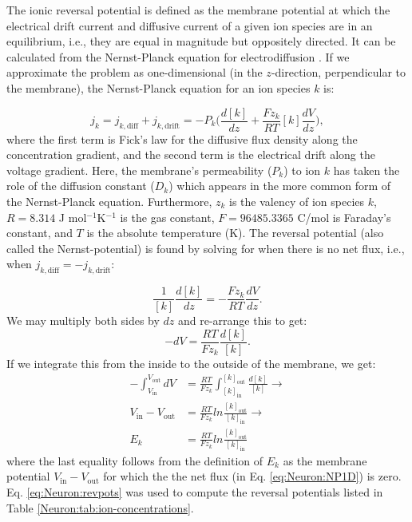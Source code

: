 The ionic reversal potential is defined as the membrane potential at which the electrical drift current and diffusive current of a given ion species are in an equilibrium, i.e., they are equal in magnitude but oppositely directed. It can be calculated from the Nernst-Planck equation for electrodiffusion . If we approximate the problem as one-dimensional (in the $z$-direction, perpendicular to the membrane), the Nernst-Planck equation for an ion species $k$ is:

\begin{equation}
j_k = j_{k,\text{diff}} + j_{k,\text{drift}} 
=  - P_k \Big(\frac{d[k]}{dz} +  \frac{Fz_k}{RT}  [k] \frac{dV}{dz} \Big), 
\label{eq:Neuron:NP1D}
\end{equation}
where the first term is Fick's law for the diffusive flux density along the concentration gradient, and the second term is the electrical drift along the voltage gradient. Here, the membrane's permeability ($P_k$) to ion $k$ has taken the role of the diffusion constant ($D_k$) which appears in the more common form of the Nernst-Planck equation. Furthermore, $z_{k}$ is the valency of ion species $k$, $R = 8.314$ J mol$^{-1}$K$^{-1}$ is the gas constant, $F = 96485.3365$ C/mol is Faraday's constant, and $T$ is the absolute temperature (K). The reversal potential (also called the Nernst-potential) is found by solving for when there is no net flux, i.e., when  $j_{k,\text{diff}} = - j_{k,\text{drift}}$:

\begin{equation}
\frac{1}{[k]} \frac{d[k]}{dz} = - \frac{Fz_k}{RT}  \frac{dV}{dz}.
\end{equation}
We may multiply both sides by $dz$ and re-arrange this to get:
\begin{equation}
-dV = \frac{RT}{Fz_k}  \frac{d[k]}{[k]}.
\end{equation}
If we integrate this from the inside to the outside of the membrane, we get:
\begin{align}
-\int_{V_{\text{in}}}^{V_{\text{out}}}  dV &= \frac{RT}{Fz_k}  \int_{[k]_{\text{in}}}^{[k]_{\text{out}}} \frac{d[k]}{[k]} \rightarrow \\
V_{\text{in}}-V_{\text{out}} &= \frac{RT}{Fz_k} ln \frac{[k]_{\text{out}}} {[k]_{\text{in}}} \rightarrow \\
E_k & =  \frac{RT}{Fz_k}  ln \frac{[k]_{\text{out}}} {[k]_{\text{in}}} 
\label{eq:Neuron:revpots}
\end{align}
where the last equality follows from the definition of $E_k$ as the membrane potential $V_{\text{in}}-V_{\text{out}}$ for which the the net flux (in Eq. \ref{eq:Neuron:NP1D}) is zero. Eq. \ref{eq:Neuron:revpots} was used to compute the reversal potentials listed in Table \ref{Neuron:tab:ion-concentrations}. 

